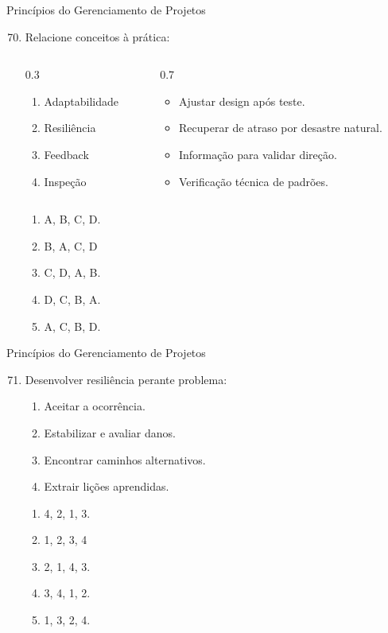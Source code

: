 \documentclass{beamer}
\begin{document}
\begin{frame}{Princípios do Gerenciamento de Projetos}
	\begin{enumerate}
		\setcounter{enumi}{69}
		\justifying
		\item Relacione conceitos à prática:
		\begin{columns}
			\begin{column}{0.3\textwidth}
				\begin{enumerate}[A]
					\item Adaptabilidade
					\item Resiliência
					\item Feedback
					\item Inspeção
				\end{enumerate}
			\end{column}
			\begin{column}{0.7\textwidth}
				\begin{itemize}
					\item Ajustar design após teste.
					\item Recuperar de atraso por desastre natural.
					\item Informação para validar direção.
					\item Verificação técnica de padrões.
				\end{itemize}
			\end{column}
		\end{columns}
		\begin{enumerate}[a]
			\item A, B, C, D.
			\item \alert<2>{B, A, C, D}
			\item C, D, A, B.
			\item D, C, B, A.
			\item A, C, B, D.
		\end{enumerate}
	\end{enumerate}
\end{frame}

\begin{frame}{Princípios do Gerenciamento de Projetos}
	\begin{enumerate}
		\setcounter{enumi}{70}
		\justifying
		\item Desenvolver resiliência perante problema:
		\begin{enumerate}[I]
			\item Aceitar a ocorrência.
			\item Estabilizar e avaliar danos.
			\item Encontrar caminhos alternativos.
			\item Extrair lições aprendidas.
		\end{enumerate}
		\begin{enumerate}[a]
			\item 4, 2, 1, 3.
			\item \alert<2>{1, 2, 3, 4}
			\item 2, 1, 4, 3.
			\item 3, 4, 1, 2.
			\item 1, 3, 2, 4.
		\end{enumerate}
	\end{enumerate}
\end{frame}
\end{document}
